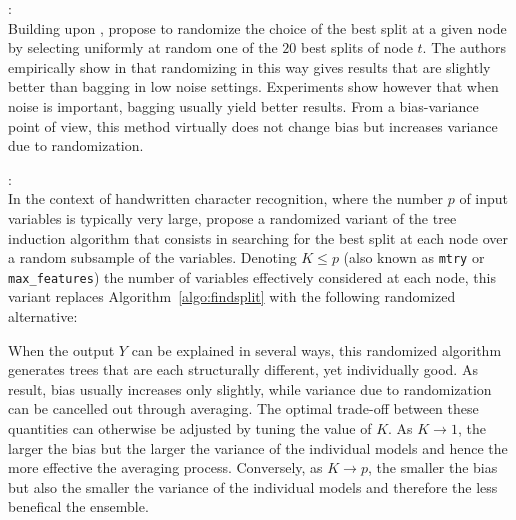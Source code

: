 \begin{description}
\item \citet{dietterich:1995}: \hfill \\
    Building upon \citep{kwok:1990}, \citet{dietterich:1995} propose
    to randomize the choice of the best split at a given node by selecting
    uniformly at random one of the $20$ best splits of node $t$. The authors empirically
    show in \citep{dietterich:1995,dietterich:2000} that randomizing in this
    way gives results that are slightly better than bagging in low noise settings.
    Experiments show however that when noise is important, bagging usually
    yield better results. From a bias-variance point of view, this method
    virtually does not change bias but increases variance due to randomization.

\item \citet{amit:1997}: \hfill \\
    In the context of handwritten character recognition, where the number $p$
    of input variables is typically very large, \citet{amit:1997} propose a
    randomized variant of the tree induction algorithm that consists in
    searching for the best split at each node over a random subsample of the
    variables. Denoting $K \leq p$ (also known as \texttt{mtry} or
    \texttt{max\_features}) the number of variables effectively considered at
    each node, this variant replaces Algorithm~\ref{algo:findsplit}
    with the following randomized alternative:
    When the output $Y$ can be explained in several ways, this randomized
    algorithm generates trees that are each structurally different, yet
    individually good. As result, bias usually increases only slightly, while
    variance due to randomization can be cancelled out through averaging. The
    optimal trade-off between these quantities can otherwise be adjusted by
    tuning the value of $K$. As $K \to 1$, the larger the bias but the larger the
    variance of the individual models and hence the more effective the
    averaging process. Conversely, as $K \to p$, the smaller the bias but also the
    smaller the variance of the individual models and therefore the less
    benefical the ensemble.


\end{description}
